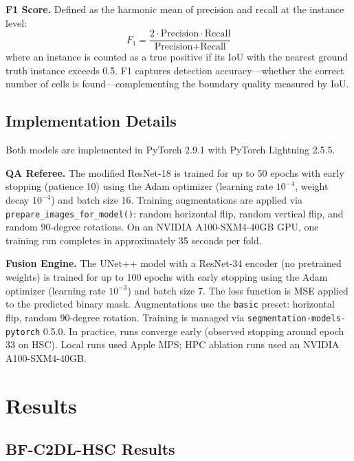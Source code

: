 \textbf{F1 Score.} Defined as the harmonic mean of precision and recall at the instance level:
\begin{equation}
F_1 = \frac{2 \cdot \text{Precision} \cdot \text{Recall}}{\text{Precision} + \text{Recall}}
\end{equation}
where an instance is counted as a true positive if its IoU with the nearest ground truth instance
exceeds 0.5. F1 captures detection accuracy—whether the correct number of cells is
found—complementing the boundary quality measured by IoU.

\subsection{Implementation Details}
\label{sec:implementation}

Both models are implemented in PyTorch 2.9.1 with PyTorch Lightning 2.5.5.

\textbf{QA Referee.} The modified ResNet-18 is trained for up to 50 epochs with early stopping
(patience 10) using the Adam optimizer (learning rate $10^{-4}$, weight decay $10^{-4}$) and batch
size 16. Training augmentations are applied via \texttt{prepare\_images\_for\_model()}: random
horizontal flip, random vertical flip, and random 90-degree rotations. On an NVIDIA A100-SXM4-40GB
GPU, one training run completes in approximately 35 seconds per fold.

\textbf{Fusion Engine.} The UNet++ model with a ResNet-34 encoder (no pretrained weights) is
trained for up to 100 epochs with early stopping using the Adam optimizer (learning rate $10^{-3}$)
and batch size 7. The loss function is MSE applied to the predicted binary mask. Augmentations use
the \texttt{basic} preset: horizontal flip, random 90-degree rotation. Training is managed via
\texttt{segmentation-models-pytorch} 0.5.0. In practice, runs converge early (observed stopping
around epoch 33 on HSC). Local runs used Apple MPS; HPC ablation runs used an NVIDIA
A100-SXM4-40GB.


\section{Results} %
\label{sec:results}

\subsection{BF-C2DL-HSC Results}
\label{sec:hsc_results}

